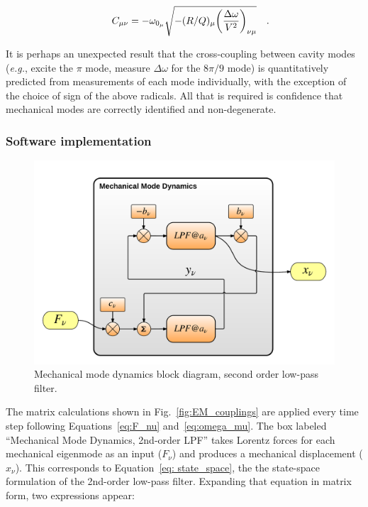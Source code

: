 \documentclass[a4paper,12pt]{article}
\begin{document}
\begin{equation}
 C_{\mu\nu} = -\omega_{0_{\mu}} \sqrt{-(R/Q)_{\mu}{ \left(\frac{\Delta \omega}{ V^2}\right)_{\nu \mu}}}\rlap{~~~.}
\end{equation}

It is perhaps an unexpected result that the cross-coupling between cavity modes ({\it e.g.}, excite the $\pi$ mode, measure $\Delta\omega$ for the $8\pi/9$ mode) is quantitatively predicted from measurements of each mode individually, with the exception of the choice of sign of the above radicals.  All that is required is confidence that mechanical modes are correctly identified and non-degenerate.

\subsubsection{Software implementation}

\begin{figure}
\centering
\includegraphics[scale=0.65]{../figures/mech_state_space_blocks.png}
\caption{Mechanical mode dynamics block diagram, second order low-pass filter.}
\label{fig:mech_state_space}
\end{figure}

The matrix calculations shown in Fig.~\ref{fig:EM_couplings} are applied every time step following Equations~\ref{eq:F_nu} and~\ref{eq:omega_mu}. The box labeled ``Mechanical Mode Dynamics, 2nd-order LPF'' takes Lorentz forces for each mechanical eigenmode as an input ($F_{\nu}$) and produces a mechanical displacement ($x_{\nu}$). This corresponds to Equation~\ref{eq: state_space}, the the state-space formulation of the 2nd-order low-pass filter. Expanding that equation in matrix form, two expressions appear:
\end{document}
